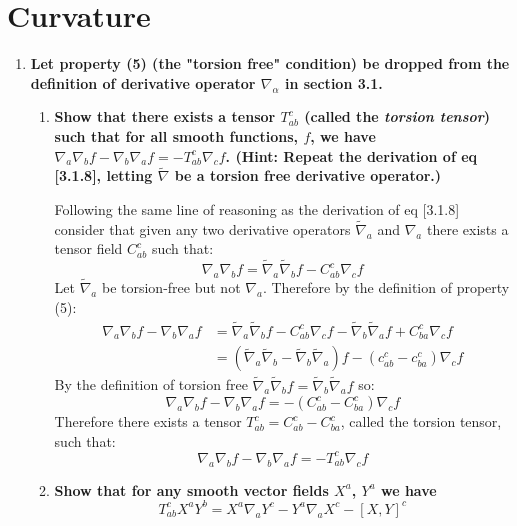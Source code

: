 \documentclass[9pt]{report}
\begin{document}
\chapter{Curvature}
\begin{enumerate}
  \item \textbf{ Let property (5) (the "torsion free" condition) be dropped from the
    definition of derivative operator $\nabla_\alpha$ in section 3.1.}
  \begin{enumerate}
  \item \textbf{Show that there exists a tensor $T^c_{ab}$ (called the \emph{torsion tensor})
    such that for all smooth functions, $f$, we have $\nabla_a \nabla_b f - \nabla_b \nabla_a f = - T^c_{ab} \nabla_c f$.
    (Hint: Repeat the derivation of eq [3.1.8], letting $\tilde{\nabla}$ be a torsion free derivative operator.)}

    Following the same line of reasoning as the derivation of eq [3.1.8] consider
    that given any two derivative operators $\tilde{\nabla}_a$ and $\nabla_a$
    there exists a tensor field $C^c_{ab}$ such that:
    \[
      \nabla_a \nabla_b f = \tilde{\nabla}_a \tilde{\nabla}_b f - C^c_{ab} \nabla_c f
    \]
    Let $\tilde{\nabla}_a$ be torsion-free but not $\nabla_a$. Therefore by
    the definition of property (5):
    \[
      \begin{align}
        \nabla_a \nabla_b f - \nabla_b \nabla_a f &= \tilde{\nabla}_a \tilde{\nabla}_b f - C^c_{ab} \nabla_c f - \tilde{\nabla}_b \tilde{\nabla}_a f + C^c_{ba} \nabla_c f \\
                                                  &= ( \tilde{\nabla}_a \tilde{\nabla}_b -\tilde{\nabla}_b \tilde{\nabla}_a )f - ( c^c_{ab} - c^c_{ba}) \nabla_c f
      \end{align}
    \]
    By the definition of torsion free $\tilde{\nabla}_a \tilde{\nabla}_b f = \tilde{\nabla}_b \tilde{\nabla}_af$ so:
    \[
      \nabla_a \nabla_b f - \nabla_b \nabla_a f = - ( C^c_{ab} - C^c_{ba}) \nabla_c f

    \]
    Therefore there exists a tensor $T^c_{ab} =  C^c_{ab} - C^c_{ba}$, called the
    torsion tensor, such that:
    \[
      \nabla_a \nabla_b f - \nabla_b \nabla_a f = - T^c_{ab} \nabla_c f

    \]
  \item \textbf{Show that for any smooth vector fields $X^a$, $Y^a$ we have}
    \[
      T^c_{ab} X^a Y^b = X^a \nabla_a Y^c - Y^a \nabla_a X^c - [X, Y]^c
    \]
  \end{enumerate}
\end{enumerate}
\end{document}
